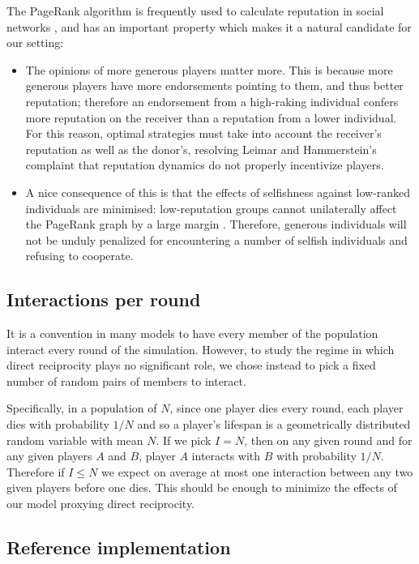 \documentclass{amsart}
\begin{document}
The PageRank algorithm is frequently used to calculate reputation in
social networks \cite{pujol_extracting_2002}, and has an important
property which makes it a natural candidate for our setting:
\begin{itemize}
\item
The opinions of more generous players matter more. This is because
more generous players have more endorsements pointing to them, and
thus better reputation; therefore an endorsement from a high-raking
individual confers more reputation on the receiver than a reputation
from a lower individual. For this reason, optimal strategies must take
into account the receiver's reputation as well as the donor's,
resolving Leimar and Hammerstein's complaint
\cite{leimar_evolution_2001} that reputation dynamics do not properly
incentivize players.
\item
A nice consequence of this is that the effects of selfishness against
low-ranked individuals are minimised: low-reputation groups cannot
unilaterally affect the PageRank graph by a large margin
\cite{langville_deeper_2004}. Therefore, generous individuals will not
be unduly penalized for encountering a number of selfish individuals
and refusing to cooperate.
\end{itemize}

\subsection{Interactions per round}
\label{section-inter_per_round}

It is a convention in many models to have every member of the
population interact every round of the simulation. However, to study
the regime in which direct reciprocity plays no significant role, we
chose instead to pick a fixed number of random pairs of members to
interact. 

Specifically, in a population of $N$, since one player dies every
round, each player dies with probability $1/N$ and so a player's
lifespan is a geometrically distributed random variable with mean
$N$. If we pick $I=N$, then on any given round and for any given
players $A$ and $B$, player $A$ interacts with $B$ with probability
$1/N$. Therefore if $I\le N$ we expect on average at most one
interaction between any two given players before one dies. This should
be enough to minimize the effects of our model proxying direct
reciprocity.

\subsection{Reference implementation}
\label{section-implementation}
\end{document}

